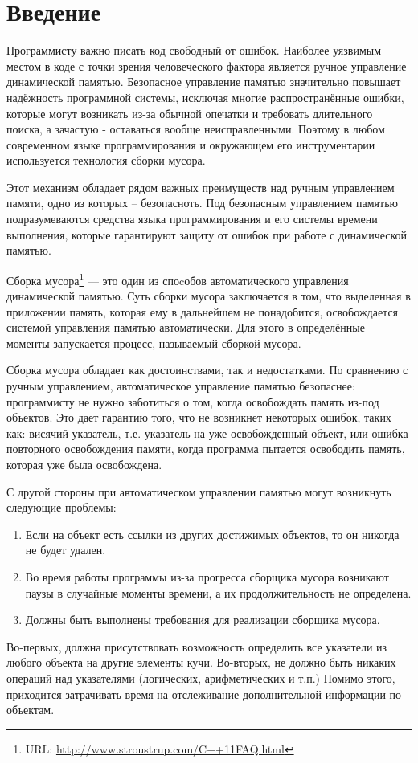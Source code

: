 \setcounter{page}{4}
\section*{Введение}
Программисту важно писать  код свободный от ошибок. Наиболее уязвимым местом в коде с точки зрения человеческого фактора является ручное управление динамической памятью.  Безопасное управление памятью значительно повышает надёжность программной системы, исключая многие распространённые ошибки, которые могут возникать из-за обычной опечатки и требовать длительного поиска, а зачастую  -  оставаться вообще неисправленными. Поэтому в любом современном языке программирования и окружающем его инструментарии используется технология сборки мусора.

Этот механизм обладает рядом важных преимуществ над ручным управлением памяти, одно из которых -- безопасноть. Под безопасным управлением памятью подразумеваются средства языка программирования и его системы времени выполнения, которые гарантируют защиту от ошибок при работе с динамической памятью.
 
Сборка мусора\footnote{URL: \url{http://www.stroustrup.com/C++11FAQ.html}} — это один из споcобов автоматического управления динамической памятью. Суть сборки мусора заключается в том, что выделенная в приложении память, которая ему в дальнейшем не понадобится, освобождается системой управления памятью автоматически. Для этого в определённые моменты запускается процесс, называемый сборкой мусора.
 
Сборка мусора обладает как достоинствами, так и недостатками. По сравнению с ручным управлением, автоматическое управление памятью безопаснее: программисту не нужно заботиться о том, когда освобождать память из-под объектов. Это дает гарантию того, что не возникнет некоторых ошибок, таких как: висячий указатель, т.е. указатель на уже освобожденный объект, или ошибка повторного освобождения памяти, когда программа пытается освободить память, которая уже была освобождена.

С другой стороны при автоматическом управлении памятью могут возникнуть следующие проблемы:
\begin{enumerate}
\item Если на объект есть ссылки из других достижимых объектов, то он никогда не будет удален.
\item Во время работы программы из-за прогресса сборщика мусора возникают паузы в случайные моменты времени, а их продолжительность не определена.
\item  Должны быть выполнены требования для реализации сборщика мусора.
\end{enumerate}
Во-первых, должна присутствовать возможность определить все указатели из любого объекта на другие элементы кучи.
Во-вторых, не должно быть никаких операций над указателями (логических, арифметических и т.п.)
Помимо этого, приходится затрачивать время на отслеживание дополнительной информации по объектам.


